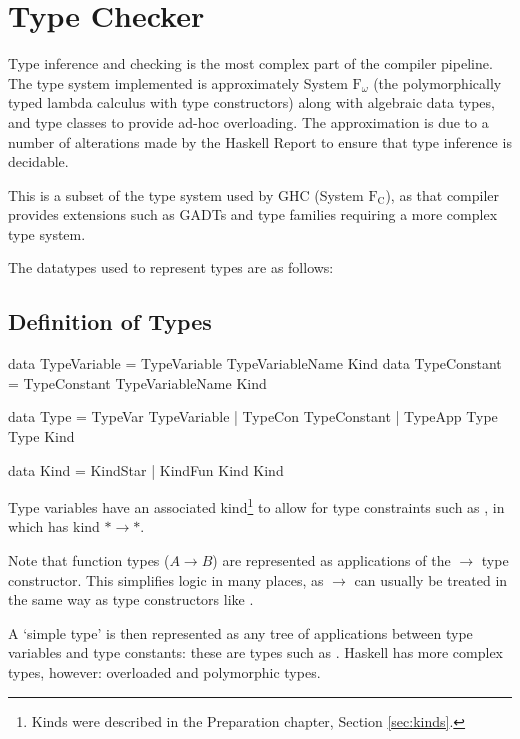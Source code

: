 \documentclass[dissertation.tex]{subfiles}
\begin{document}
\section{Type Checker}
{
    Type inference and checking is the most complex part of the compiler pipeline. The type system implemented is approximately System \(\text{F}_\omega\) (the polymorphically typed lambda calculus with type constructors) along with algebraic data types, and type classes to provide ad-hoc overloading. The approximation is due to a number of alterations made by the Haskell Report to ensure that type inference is decidable.
    
    This is a subset of the type system used by GHC (System \(\text{F}_\text{C}\)), as that compiler provides extensions such as GADTs and type families requiring a more complex type system.

    The datatypes used to represent types are as follows:

    \subsection{Definition of Types}
    {
        \begin{haskellfigure}
        data TypeVariable = TypeVariable TypeVariableName Kind
        data TypeConstant = TypeConstant TypeVariableName Kind

        data Type = TypeVar TypeVariable
                  | TypeCon TypeConstant
                  | TypeApp Type Type Kind

        data Kind = KindStar
                  | KindFun Kind Kind
        \end{haskellfigure}

        Type variables have an associated kind\footnote{Kinds were described in the Preparation chapter, Section \ref{sec:kinds}.} to allow for type constraints such as , in which  has kind \(*\rightarrow*\).

        Note that function types (\(A \rightarrow B\)) are represented as applications of the \(\rightarrow\) type constructor. This simplifies logic in many places, as \(\rightarrow\) can usually be treated in the same way as type constructors like .

        A `simple type' is then represented as any tree of applications between type variables and type constants: these are types such as . Haskell has more complex types, however: overloaded and polymorphic types.

}}
\end{document}

